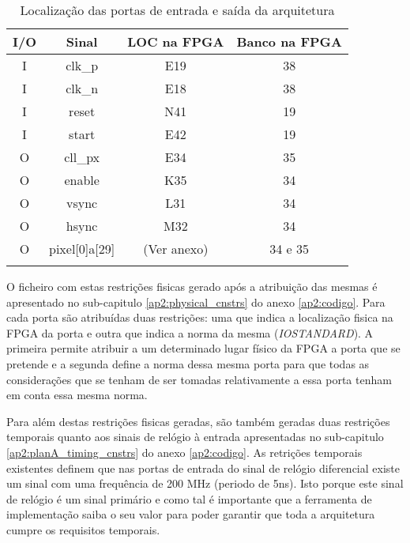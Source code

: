 \begin{longtable}[h!]
	{|c|c|c|c|}
	\hline
	\centering
		\textbf{I/O} & \textbf{Sinal}        & \textbf{LOC na FPGA} & \textbf{Banco na FPGA} \\ \hline  \endhead
		I            & clk\_p                & E19                  & 38                     \\ \hline
		I            & clk\_n                & E18                  & 38                     \\ \hline
		I            & reset                 & N41                  & 19                     \\ \hline
		I            & start                 & E42                  & 19                     \\ \hline
		O            & cll\_px               & E34                  & 35                     \\ \hline
		O            & enable                & K35                  & 34                     \\ \hline
		O            & vsync                 & L31                  & 34                     \\ \hline
		O            & hsync                 & M32                  & 34                     \\ \hline
		O            & pixel{[}0{]}a{[}29{]} & (Ver anexo)          & 34 e 35                \\ \hline
	\caption{Localização das portas de entrada e saída da arquitetura}
	\label{table:LOCplanA_simples}
\end{longtable}

O ficheiro com estas restrições fisicas gerado após a atribuição das mesmas é apresentado no sub-capitulo \ref{ap2:physical_cnstrs} do anexo \ref{ap2:codigo}. Para cada porta são atribuídas duas restrições: uma que indica a localização fisica na FPGA da porta e outra que indica a norma da mesma (\textit{IOSTANDARD}). A primeira permite atribuir a um determinado lugar físico da FPGA a porta que se pretende e a segunda define a norma dessa mesma porta para que todas as considerações que se tenham de ser tomadas relativamente a essa porta tenham em conta essa mesma norma.

Para além destas restrições fisicas geradas, são também geradas duas restrições temporais quanto aos sinais de relógio à entrada apresentadas no sub-capitulo \ref{ap2:planA_timing_cnstrs} do anexo \ref{ap2:codigo}. As retrições temporais existentes definem que nas portas de entrada do sinal de relógio diferencial existe um sinal com uma frequência de 200 MHz (periodo de 5ns). Isto porque este sinal de relógio é um sinal primário e como tal é importante que a ferramenta de implementação saiba o seu valor para poder garantir que toda a arquitetura cumpre os requisitos temporais.

